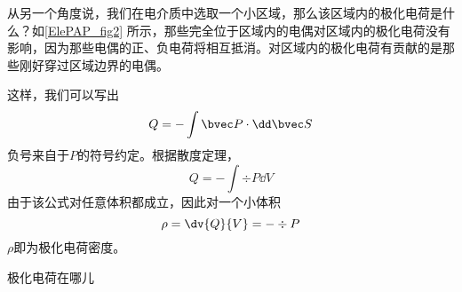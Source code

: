 从另一个角度说，我们在电介质中选取一个小区域，那么该区域内的极化电荷是什么？如\autoref{ElePAP_fig2} 所示，那些完全位于区域内的电偶对区域内的极化电荷没有影响，因为那些电偶的正、负电荷将相互抵消。对区域内的极化电荷有贡献的是那些刚好穿过区域边界的电偶。

这样，我们可以写出
$$
Q= - \int \bvec P \cdot \dd \bvec S
$$
负号来自于$P$的符号约定。根据散度定理，
$$
Q= - \int \div P \dd V
$$
由于该公式对任意体积都成立，因此对一个小体积
\begin{equation}
\rho = \dv{Q}{V}= - \div P
\end{equation}
$\rho$即为极化电荷密度。

\begin{example}{极化电荷在哪儿}

\end{example}
